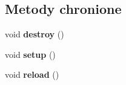 \subsection*{Metody chronione}
\begin{DoxyCompactItemize}
\item 
\hypertarget{class_swift_1_1_object_a5fdcff5fc9eedd88e9d6b6374f7cc865}{void {\bfseries destroy} ()}\label{class_swift_1_1_object_a5fdcff5fc9eedd88e9d6b6374f7cc865}

\item 
\hypertarget{class_swift_1_1_object_a1732ea6a4c30701e80e2abdc00035cef}{void {\bfseries setup} ()}\label{class_swift_1_1_object_a1732ea6a4c30701e80e2abdc00035cef}

\item 
\hypertarget{class_swift_1_1_object_ae10d931f1c4bf41b6b2376b4a7d53312}{void {\bfseries reload} ()}\label{class_swift_1_1_object_ae10d931f1c4bf41b6b2376b4a7d53312}

\end{DoxyCompactItemize}
